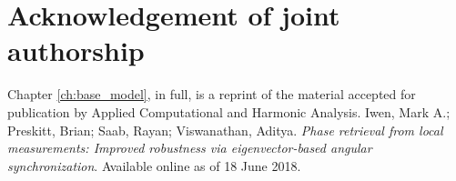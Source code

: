 \section*{Acknowledgement of joint authorship}

Chapter \ref{ch:base_model}, in full, is a reprint of the material accepted for publication by Applied Computational and Harmonic Analysis.  Iwen, Mark A.; Preskitt, Brian; Saab, Rayan; Viswanathan, Aditya.  \emph{Phase retrieval from local measurements: Improved robustness via eigenvector-based angular synchronization}.  Available online as of 18 June 2018.
